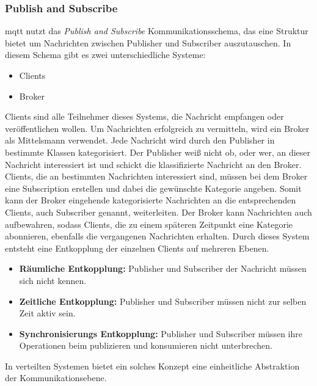 \subsubsection{Publish and Subscribe} \label{s:publish-subscribe}
\ac{mqtt} nutzt das \textit{Publish and Subscribe} Kommunikationsschema, das eine Struktur bietet um Nachrichten zwischen Publisher und Subscriber auszutauschen. In diesem Schema gibt es zwei unterschiedliche Systeme:
\begin{itemize}
    \item Clients
    \item Broker
\end{itemize}
Clients sind alle Teilnehmer dieses Systems, die Nachricht empfangen oder veröffentlichen wollen. Um Nachrichten erfolgreich zu vermitteln, wird ein Broker als Mittelsmann verwendet.\cite{teamGettingStartedMQTT}
Jede Nachricht wird durch den Publisher in bestimmte Klassen kategorisiert. Der Publisher wei{\ss} nicht ob, oder wer, an dieser Nachricht interessiert ist und schickt die klassifizierte Nachricht an den Broker.
Clients, die an bestimmten Nachrichten interessiert sind, müssen bei dem Broker eine Subscription erstellen und dabei die gewünschte Kategorie angeben.
Somit kann der Broker eingehende kategorisierte Nachrichten an die entsprechenden Clients, auch Subscriber genannt, weiterleiten.
Der Broker kann Nachrichten auch aufbewahren, sodass Clients, die zu einem späteren Zeitpunkt eine Kategorie abonnieren, ebenfalls die vergangenen Nachrichten erhalten.
\cite{EverythingYouNeed}
Durch dieses System entsteht eine Entkopplung der einzelnen Clients auf mehreren Ebenen.
\begin{itemize}
    \item \textbf{Räumliche Entkopplung:} Publisher und Subscriber der Nachricht müssen sich nicht kennen.
    \item \textbf{Zeitliche Entkopplung:} Publisher und Subscriber müssen nicht zur selben Zeit aktiv sein.
    \item \textbf{Synchronisierungs Entkopplung:} Publisher und Subscriber müssen ihre Operationen beim publizieren und konsumieren nicht unterbrechen.
\end{itemize}
\cite{teamPublishSubscribeMQTT}
In verteilten Systemen bietet ein solches Konzept eine einheitliche Abstraktion der Kommunikationsebene.
\cite{domingusDistributedSystemsIntroduction2020}
